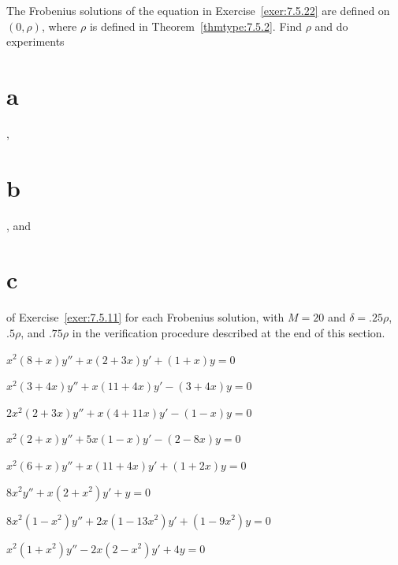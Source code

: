\begin{exerciselist}
  \item\label{exer:7.5.27} \Lex The Frobenius solutions of the equation in
        Exercise~\ref{exer:7.5.22} are defined on $(0,\rho)$, where $\rho$ is defined in
        Theorem~\ref{thmtype:7.5.2}. Find $\rho$ and do experiments \part{a}, \part{b}, and \part{c}
        of Exercise~\ref{exer:7.5.11} for each Frobenius solution, with $M=20$ and $\delta=.25\rho$,
        $.5\rho$, and $.75\rho$ in the verification procedure described at the end of this section.


  \item\label{exer:7.5.28} \Cex $x^{2}(8+x)y''+x(2+3x)y'+(1+x)y=0$

  \item\label{exer:7.5.29} \Cex $x^{2}(3+4x)y''+x(11+4x)y'-(3+4x)y=0$

  \item\label{exer:7.5.30} \Cex $2x^{2}(2+3x)y''+x(4+11x)y'-(1-x)y=0$

  \item\label{exer:7.5.31} \Cex $x^{2}(2+x)y''+5x(1-x)y'-(2-8x)y=0$

  \item\label{exer:7.5.32} \Cex $x^{2}(6+x)y''+x(11+4x)y'+(1+2x)y=0$


  \item\label{exer:7.5.33} $8x^{2}y''+x(2+x^{2})y'+y=0$

  \item\label{exer:7.5.34} $8x^{2}(1-x^{2})y''+2x(1-13x^{2})y'+(1-9x^{2})y=0$

  \item\label{exer:7.5.35} $x^{2}(1+x^{2})y''-2x(2-x^{2})y'+4y=0$


\end{exerciselist}
